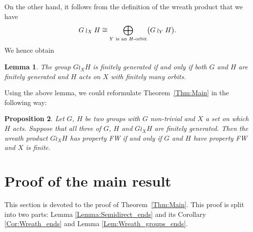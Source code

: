 \documentclass[a4paper]{article}
\newtheorem{lem}{Lemma}[section]
\newtheorem{prop}[lem]{Proposition}
\theoremstyle{definition}
\theoremstyle{remark}%
\begin{document}
On the other hand, it follows from the definition of the wreath product that we have
\[
	G\wr_XH\cong\bigoplus_{Y\textnormal{ is an $H$-orbit}}\bigl(G\wr_YH\bigr).
\]
We hence obtain
%
%
\begin{lem}
The group $G\wr_XH$ is finitely generated if and only if both $G$ and $H$ are finitely generated and $H$ acts on $X$ with finitely many orbits.
\end{lem}
%
%
Using the above lemma, we could reformulate Theorem~\ref{Thm:Main} in the following way:
%
%
\begin{prop}
Let $G$, $H$ be two groups with $G$ non-trivial and $X$ a set on which $H$ acts. Suppose that all three of $G$, $H$ and $G\wr_XH$ are finitely generated. Then the wreath product $G\wr_XH$ has property FW if and only if $G$ and $H$ have property FW and $X$ is finite.
\end{prop}
%
%
%
%
%
%
%
%
%
%
\section{Proof of the main result}
\label{Section:Proof}
%
%
%
%
%
This section is devoted to the proof of Theorem~\ref{Thm:Main}. This proof is split into two parts: Lemma \ref{Lemma:Semidirect_ends} and its Corollary \ref{Cor:Wreath_ends} and Lemma \ref{Lem:Wreath_groups_ends}.
\end{document}

